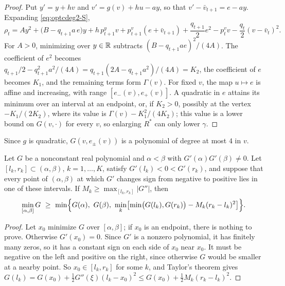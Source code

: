 \begin{proof}
Put $y'=y+hv$ and $v'=g(v)+hu-ay$, so that $v'-\bar v_{t+1}=e-ay$.
Expanding \eqref{eq:optcdeg2-S},
\[
\rho_t=Ay^2+\bigl(B-q_{t+1}a\,e\bigr)y+h\,p^y_{t+1}v+p^v_{t+1}(e+\bar v_{t+1})+\frac{q_{t+1}}2e^2-p^v_tv-\frac{q_t}2(v-\bar v_t)^2 .
\]
For $A>0$, minimizing over $y\in\mathbb{R}$ subtracts $(B-q_{t+1}ae)^2/(4A)$.
The coefficient of $e^2$ becomes $q_{t+1}/2-q_{t+1}^2a^2/(4A)=q_{t+1}(2A-q_{t+1}a^2)/(4A)=K_2$, the coefficient of $e$ becomes $K_1$, and the remaining terms form $\Gamma(v)$.
For fixed $v$, the map $u\mapsto e$ is affine and increasing, with range $[e_-(v),e_+(v)]$.
A quadratic in $e$ attains its minimum over an interval at an endpoint, or, if $K_2>0$, possibly at the vertex $-K_1/(2K_2)$, where its value is $\Gamma(v)-K_1^2/(4K_2)$; this value is a lower bound on $G(v,\cdot)$ for every $v$, so enlarging $R^*$ can only lower $\gamma$.
\end{proof}

Since $g$ is quadratic, $G(v,e_\pm(v))$ is a polynomial of degree at most $4$ in $v$.

\begin{lemma}\label{lem:optcdeg2-quartic}
Let $G$ be a nonconstant real polynomial and $\alpha<\beta$ with $G'(\alpha)G'(\beta)\neq0$.
Let $[l_k,r_k]\subset(\alpha,\beta)$, $k=1,\dots,K$, satisfy $G'(l_k)<0<G'(r_k)$, and suppose that every point of $(\alpha,\beta)$ at which $G'$ changes sign from negative to positive lies in one of these intervals.
If $M_k\ge\max_{[l_k,r_k]}|G''|$, then
\[
\min_{[\alpha,\beta]}G\ \ge\ \min\Bigl\{G(\alpha),\ G(\beta),\ \min_k\bigl[\min\bigl(G(l_k),G(r_k)\bigr)-M_k(r_k-l_k)^2\bigr]\Bigr\}.
\]
\end{lemma}

\begin{proof}
Let $x_0$ minimize $G$ over $[\alpha,\beta]$; if $x_0$ is an endpoint, there is nothing to prove.
Otherwise $G'(x_0)=0$.
Since $G'$ is a nonzero polynomial, it has finitely many zeros, so it has a constant sign on each side of $x_0$ near $x_0$.
It must be negative on the left and positive on the right, since otherwise $G$ would be smaller at a nearby point.
So $x_0\in[l_k,r_k]$ for some $k$, and Taylor's theorem gives $G(l_k)=G(x_0)+\tfrac12G''(\xi)(l_k-x_0)^2\le G(x_0)+\tfrac12M_k(r_k-l_k)^2$.
\end{proof}


